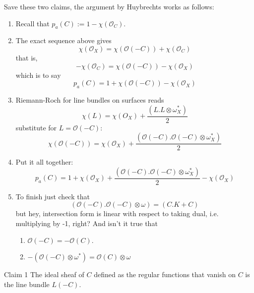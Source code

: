 Save these two claims, the argument by Huybrechts works as follows:
\begin{enumerate}[label=\textbf{Step \arabic*}]
\item Recall that \(p_a(C):=1-\chi(\mathcal{O}_C)\).
\item The exact sequence above gives \[\chi(\mathcal{O}_X)=\chi(\mathcal{O}(-C))+\chi(\mathcal{O}_C)\]
	that is,
	\[-\chi(\mathcal{O}_C)=\chi(\mathcal{O}(-C))-\chi(\mathcal{O}_X)\]
which is to say
\[p_a(C)=1+\chi(\mathcal{O}(-C))-\chi(\mathcal{O}_X)\]
\item Riemann-Roch for line bundles on surfaces reads
	\[\boxed{\chi(L)=\chi(O_X)+\frac{(L.L \otimes \omega_X^*)}{2}}\]
substitute for \(L=\mathcal{O}(-C)\):
\[\chi(\mathcal{O}(-C))=\chi(\mathcal{O}_X)+\frac{(\mathcal{O}(-C).\mathcal{O}(-C)\otimes \omega_X^*)}{2}\]
\item Put it all together:
	\[p_a(C)=1+\chi(\mathcal{O}_X)+\frac{(\mathcal{O}(-C).\mathcal{O}(-C)\otimes \omega_X^*)}{2}-\chi(\mathcal{O}_X)\]
\item To finish just check that
	\[(\mathcal{O}(-C).\mathcal{O}(-C) \otimes \omega)=(C.K+C)\]
but hey, intersection form is linear with respect to taking dual, i.e. multiplying by -1, right? And isn't it true that
\begin{enumerate}
\item \(\mathcal{O}(-C)=-\mathcal{O}(C)\).
\item \(-(\mathcal{O}(-C) \otimes \omega^*)=\mathcal{O}(C) \otimes \omega\)
\end{enumerate}
\end{enumerate}

\begin{thing7}{Claim 1}\leavevmode
The ideal sheaf of  \(C\) defined as the regular functions that vanish on \(C\) is the line bundle  \(L(-C)\).
\end{thing7}

